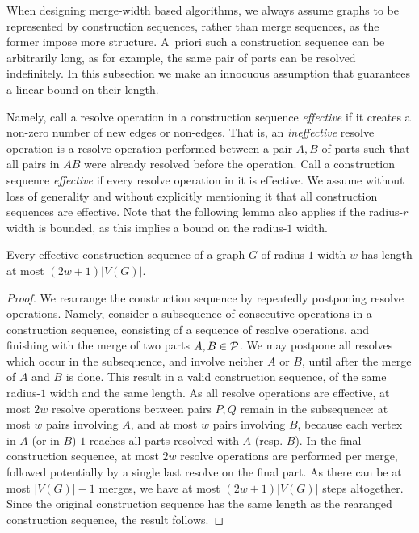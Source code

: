 When designing merge-width based algorithms,
we always assume graphs to be represented by construction sequences, rather than merge sequences,
as the former impose more structure.
A~priori such a construction sequence can be arbitrarily long, as for example, the same pair of parts can be resolved indefinitely.
In this subsection we make an innocuous assumption that guarantees a linear bound on their length.


Namely, call a resolve operation in a construction sequence 
\emph{effective} if it creates a non-zero number of new edges or non-edges. 
That is, an \emph{ineffective} resolve operation 
is a resolve operation performed between a pair $A,B$ of parts 
such that all pairs in $AB$ were already resolved before the operation.
Call a construction sequence \emph{effective} if 
every resolve operation in it is effective.
We assume without loss of generality and without explicitly mentioning it that all construction sequences are effective.
Note that the following lemma also applies if the radius-\(r\) width is bounded, as this implies a bound on the radius-\(1\) width.

\begin{lemma}\label{lem:effective-construction-seq}
  Every effective construction sequence of a graph $G$ of radius-$1$ width $w$ has length at most $(2w+1)|V(G)|$.
\end{lemma}
\begin{proof}
  We rearrange the construction sequence by repeatedly postponing resolve operations.
  Namely, consider a subsequence of consecutive operations in a construction sequence,
  consisting of a sequence of resolve operations, and finishing with the merge
  of two parts $A,B\in\cal P$. We may postpone all resolves which occur in the subsequence, and involve 
  neither $A$ or $B$, until after the merge of $A$ and $B$ is done.
  This result in a valid construction sequence,
  of the same radius-$1$ width and the same length.
  As all resolve operations are effective,
  at most $2w$ resolve operations between pairs $P,Q$ remain in the subsequence: at most $w$ pairs involving $A$, and at most $w$ pairs involving $B$, because each vertex in $A$ (or in $B$) $1$-reaches all parts resolved with $A$ (resp. $B$). 
  In the final construction sequence, at most $2w$ resolve operations are performed per merge,
  followed potentially by a single last resolve on the final part.
  As there can be at most \(|V(G)|-1\) merges, we have at most $(2w+1)|V(G)|$ steps altogether.
  Since the original construction sequence has the same length as the rearanged construction sequence, the result follows.
\end{proof}


